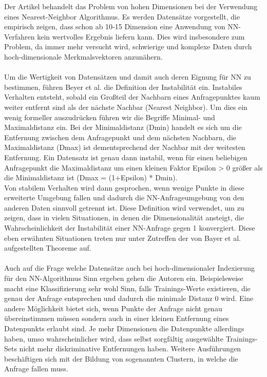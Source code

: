\documentclass{article}
\begin{document}
Der Artikel behandelt das Problem von hohen Dimensionen bei der Verwendung eines Nearest-Neighbor Algorithmus. Es werden Datensätze vorgestellt, die empirisch zeigen, dass schon ab 10-15 Dimension eine Anwendung von NN-Verfahren kein wertvolles Ergebnis liefern kann. Dies wird insbesondere zum Problem, da immer mehr versucht wird, schwierige und komplexe Daten durch hoch-dimensionale Merkmalsvektoren anzunähern.
\\
\\
Um die Wertigkeit von Datensätzen und damit auch deren Eignung für NN zu bestimmen, führen Beyer et al. die Definition der Instabilität ein. Instabiles Verhalten entsteht, sobald ein Großteil der Nachbarn eines Anfragepunktes kaum weiter entfernt sind als der nächste Nachbar (Nearest Neighbor). Um dies ein wenig formeller auszudrücken führen wir die Begriffe Minimal- und Maximaldistanz ein. Bei der Minimaldistanz (Dmin) handelt es sich um die Entfernung zwischen dem Anfragepunkt und dem nächsten Nachbarn, die Maximaldistanz (Dmax) ist dementsprechend der Nachbar mit der weitesten Entfernung. Ein Datensatz ist genau dann instabil, wenn für einen beliebigen Anfragepunkt die Maximaldistanz um einen kleinen Faktor Epsilon > 0 größer als die Minimaldistanz ist (Dmax = (1+Epsilon) * Dmin).
\\
Von stabilem Verhalten wird dann gesprochen, wenn wenige Punkte in diese erweiterte Umgebung fallen und dadurch die NN-Anfrageumgebung von den anderen Daten sinnvoll getrennt ist. Diese Definition wird verwendet, um zu zeigen, dass in vielen Situationen, in denen die Dimensionalität ansteigt, die Wahrscheinlichkeit der Instabilität einer NN-Anfrage gegen 1 konvergiert. Diese eben erwähnten Situationen treten nur unter Zutreffen der von Bayer et al. aufgestellten Theoreme auf.
\\
\\
Auch auf die Frage welche Datensätze auch bei hoch-dimensionaler Indexierung für den NN-Algorithmus Sinn ergeben gehen die Autoren ein. Beispielsweise macht eine Klassifizierung sehr wohl Sinn, falls Trainings-Werte existieren, die genau der Anfrage entsprechen und dadurch die minimale Distanz 0 wird. Eine andere Möglichkeit bietet sich, wenn Punkte der Anfrage nicht genau übereinstimmen müssen sondern auch in einer kleinen Entfernung eines Datenpunkts erlaubt sind. Je mehr Dimensionen die Datenpunkte allerdings haben, umso wahrscheinlicher wird, dass selbst sorgfältig ausgewählte Trainings-Sets nicht mehr diskriminative Entfernungen haben. Weitere Ausführungen beschäftigen sich mit der Bildung von sogenannten Clustern, in welche die Anfrage fallen muss.
\end{document}
